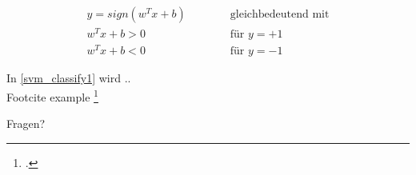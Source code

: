 \documentclass[ngerman]{beamer}
\begin{document}
\begin{frame}
	\begin{subequations} \label{svm_classify1}
		\begin{alignat}{2}
			y = sign(w^{T} x + b)  & \qquad & \text{ gleichbedeutend mit} \\
			w^{T} x + b > 0 & & \text{ für } y = +1\\
			w^{T} x + b < 0 & & \text{ für } y = -1
		\end{alignat}
	\end{subequations}

	In \cref{svm_classify1} wird .. \\
	
	Footcite example \footcite{platt_sequential_1998} \\
	
	\textcite{burges_tutorial_1998}
	
	
\end{frame}



\begin{frame}[standout]
	Fragen?
\end{frame}

\begin{frame}
	\printbibliography
\end{frame}
\end{document}
